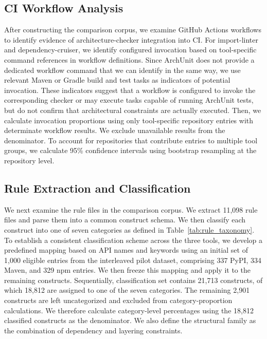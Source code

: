 \subsection{CI Workflow Analysis}

After constructing the comparison corpus, we examine GitHub Actions workflows to identify evidence of architecture-checker integration into CI. For import-linter and dependency-cruiser, we identify configured invocation based on tool-specific command references in workflow definitions. Since ArchUnit does not provide a dedicated workflow command that we can identify in the same way, we use relevant Maven or Gradle build and test tasks as indicators of potential invocation. These indicators suggest that a workflow is configured to invoke the corresponding checker or may execute tasks capable of running ArchUnit tests, but do not confirm that architectural constraints are actually executed.
Then, we calculate invocation proportions using only tool-specific
repository entries with determinate workflow results. We exclude
unavailable results from the denominator. To
account for repositories that contribute entries to multiple tool
groups, we calculate 95\% confidence intervals using bootstrap
resampling at the repository level.

\subsection{Rule Extraction and Classification}

We next examine the rule files in the comparison corpus. We extract
11,098 rule files and parse them into a common construct schema.
We then classify each construct into one of seven categories as defined in Table~\ref{tab:rule_taxonomy}. 
To establish a consistent classification scheme across the three tools, 
we develop a predefined mapping based on API names and 
keywords using an initial set of 1,000 eligible entries 
from the interleaved pilot dataset, comprising 337 PyPI, 
334 Maven, and 329 npm entries. We then freeze this mapping 
and apply it to the remaining constructs. Sequentially, 
classification set contains 21,713 constructs, 
of which 18,812 are assigned to one of the seven 
categories. The remaining 2,901 constructs are 
left uncategorized and excluded from category-proportion 
calculations. We therefore calculate category-level 
percentages using the 18,812 classified constructs 
as the denominator. We also define the structural 
family as the combination of dependency and layering 
constraints.

